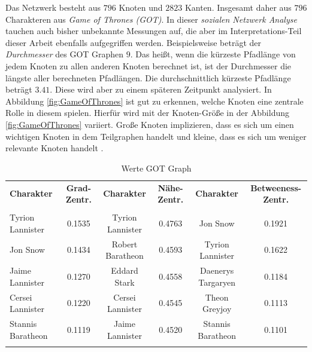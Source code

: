 Das Netzwerk besteht aus $796$ Knoten und $2823$ Kanten. Insgesamt daher aus $796$ Charakteren aus \textit{Game of Thrones (GOT)}.
In dieser \textit{sozialen Netzwerk Analyse} tauchen auch bisher unbekannte Messungen auf, die aber im Interpretations-Teil dieser Arbeit ebenfalls aufgegriffen werden. Beispielsweise beträgt der \textit{Durchmesser} des GOT Graphen $9$. Das heißt, wenn die kürzeste Pfadlänge von jedem Knoten zu allen anderen Knoten berechnet ist, ist der Durchmesser die längste aller berechneten Pfadlängen. Die durchschnittlich kürzeste Pfadlänge beträgt $3.41$. Diese wird aber zu einem späteren Zeitpunkt analysiert. In Abbildung \ref{fig:GameOfThrones} ist gut zu erkennen, welche Knoten eine zentrale Rolle in diesem spielen. Hierfür wird mit der Knoten-Größe in der Abbildung \ref{fig:GameOfThrones} variiert. Große Knoten implizieren, dass es sich um einen wichtigen Knoten in dem Teilgraphen handelt und kleine, dass es sich um weniger relevante Knoten handelt \cite{GOT}. 
\begin{table}[h!]
\footnotesize
\caption{Werte GOT Graph}
\label{TableGOT}
\begin{tabular}{lccccc}\toprule 
\textbf{Charakter} &\textbf{Grad-Zentr.} & \textbf{Charakter} &\textbf{Nähe-Zentr.}  & \textbf{Charakter} &\textbf{Betweeness-Zentr.} \\
 &\\\midrule
  Tyrion Lannister & 0.1535  & Tyrion Lannister & 0.4763 & Jon Snow& 0.1921   \\
  Jon Snow & 0.1434 & Robert Baratheon & 0.4593 & Tyrion Lannister & 0.1622   \\
  Jaime Lannister & 0.1270  & Eddard Stark& 0.4558& Daenerys Targaryen & 0.1184   \\
  Cersei Lannister & 0.1220 & Cersei Lannister & 0.4545 & Theon Greyjoy & 0.1113   \\
  Stannis Baratheon & 0.1119 & Jaime Lannister & 0.4520 & Stannis Baratheon & 0.1101   \\
       
  \\\bottomrule
 \end{tabular}
 \end{table}
